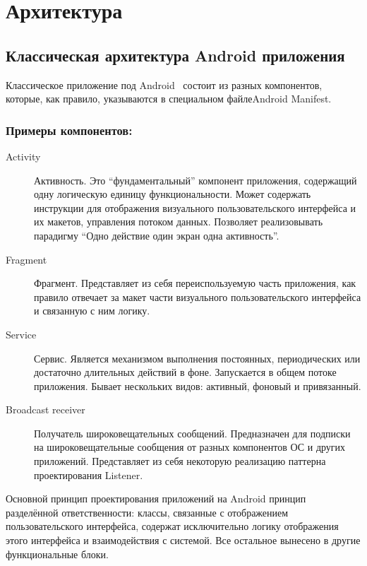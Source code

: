 \chapter{Архитектура}
\section{Классическая архитектура Android приложения}
Классическое приложение под Android~\autocite{app_arch} состоит из разных компонентов, которые, как правило, указываются в специальном файле\textemdash\space Android Manifest.

\subsection*{Примеры компонентов:}
\begin{description}
	\item[Activity~\autocite{android_activities}] Активность. Это ``фундаментальный'' компонент приложения, содержащий одну логическую единицу функциональности. Может содержать инструкции для отображения визуального пользовательского интерфейса и их макетов, управления потоком данных. Позволяет реализовывать парадигму ``Одно действие \textemdash\space один экран \textemdash\space одна активность''.
	\item[Fragment~\autocite{android_fragment}] Фрагмент. Представляет из себя переиспользуемую часть приложения, как правило отвечает за макет части визуального пользовательского интерфейса и связанную с ним логику.
	\item[Service~\autocite{android_service}] Сервис. Является механизмом выполнения постоянных, периодических или достаточно длительных действий в фоне. Запускается в общем потоке приложения. Бывает нескольких видов: активный, фоновый и привязанный.
	\item[Broadcast receiver~\autocite{android_broasdcast}] Получатель широковещательных сообщений. Предназначен для подписки на широковещательные сообщения от разных компонентов ОС и других приложений. Представляет из себя некоторую реализацию паттерна проектирования Listener.
\end{description}

Основной принцип проектирования приложений на Android \textemdash\space принцип разделённой ответственности: классы, связанные с отображением пользовательского интерфейса, содержат исключительно логику отображения этого интерфейса и взаимодействия с системой. Все остальное вынесено в другие функциональные блоки.

